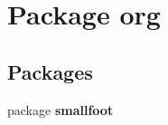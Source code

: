 \section{Package org}
\label{namespaceorg}
\subsection*{Packages}
\begin{DoxyCompactItemize}
\item 
package {\bf smallfoot}
\end{DoxyCompactItemize}

